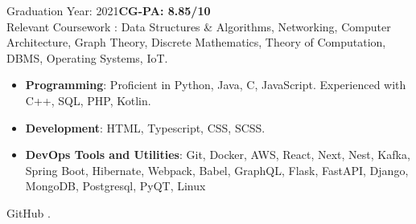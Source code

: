 \documentclass[10pt,a4paper,ragged2e]{classes/altacv}
\begin{document}


Graduation Year: 2021\hspace{5mm}\textbf{CG-PA: 8.85/10 }\\
\smallskip
Relevant Coursework : Data Structures \& Algorithms, Networking, Computer Architecture, Graph Theory, Discrete Mathematics, Theory of Computation, DBMS, Operating Systems, IoT.



\smallskip
\begin{itemize}
\item \textbf{Programming}: Proficient in Python, Java, C, JavaScript. Experienced with C++, SQL, PHP, Kotlin.
\smallskip
\item \textbf{Development}: HTML, Typescript, CSS, SCSS.
\smallskip
\item \textbf{DevOps Tools and Utilities}: Git, Docker, AWS, React, Next, Nest, Kafka, Spring Boot, Hibernate, Webpack, Babel, GraphQL, Flask, FastAPI, Django, MongoDB, Postgresql, PyQT, Linux  
\smallskip
\end{itemize}

\smallskip
\begin{footnotesize}
GitHub \number \month .\number\year
\end{footnotesize}
\clearpage
\end{document}
